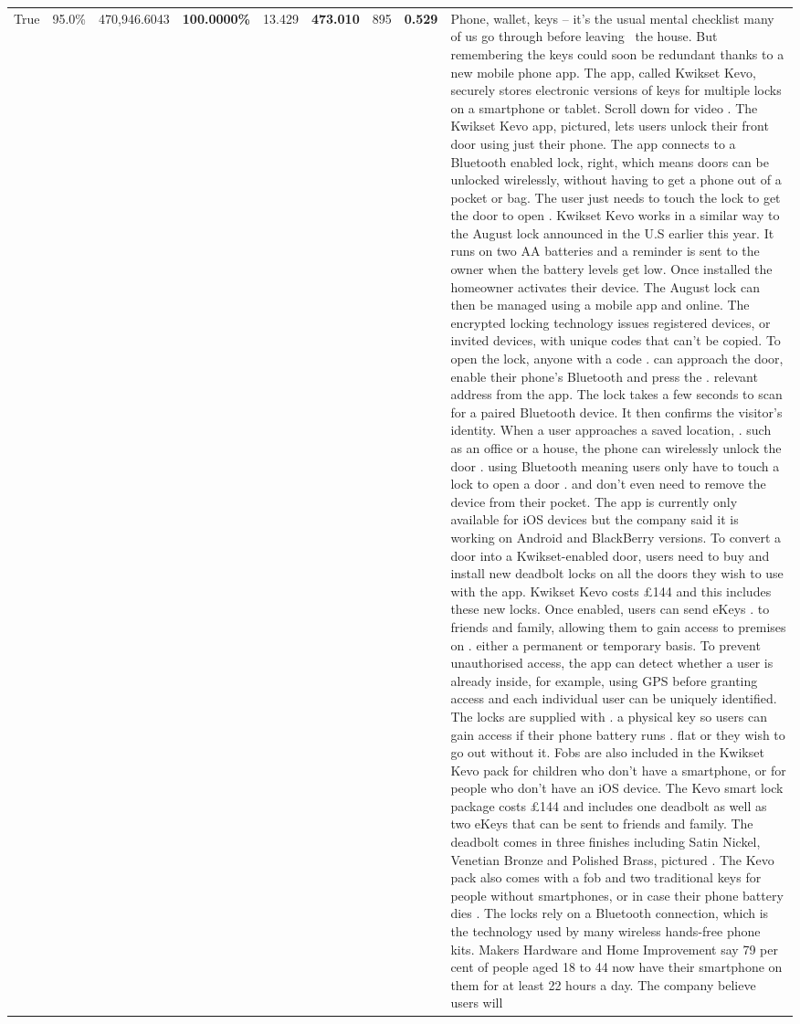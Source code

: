 \begin{table}[H]
\begin{tabular}{lllrlllll}
True & 95.0\% & 470,946.6043 & \bfseries \color{red} 100.0000\% & 13.429 & \bfseries \color{red} 473.010 & 895 & \bfseries \color{red} 0.529 & Phone, wallet, keys – it’s the usual mental checklist many of us go through before leaving  the house. But remembering the keys could soon be redundant thanks to a new mobile phone app. The app, called Kwikset Kevo, securely stores electronic versions of keys for multiple locks on a smartphone or tablet. Scroll down for video . The Kwikset Kevo app, pictured, lets users unlock their front door using just their phone. The app connects to a Bluetooth enabled lock, right, which means doors can be unlocked wirelessly, without having to get a phone out of a pocket or bag. The user just needs to touch the lock to get the door to open . Kwikset Kevo works in a similar way to the August lock announced in the U.S earlier this year. It runs on two AA batteries and a reminder is sent to the owner when the battery levels get low. Once installed the homeowner activates their device. The August lock can then be managed using a mobile app and online. The encrypted locking technology issues registered devices, or invited devices, with unique codes that can't be copied. To open the lock, anyone with a code . can approach the door, enable their phone's Bluetooth and press the . relevant address from the app. The lock takes a few seconds to scan for a paired Bluetooth device. It then confirms the visitor's identity. When a user approaches a saved location, . such as an office or a house, the phone can wirelessly unlock the door . using Bluetooth meaning users only have to touch a lock to open a door . and don't even need to remove the device from their pocket. The app is currently only available for iOS devices but the company said it is working on Android and BlackBerry versions. To convert a door into a Kwikset-enabled door, users need to buy and install new deadbolt locks on all the doors they wish to use with the app. Kwikset Kevo costs £144 and this includes these new locks. Once enabled, users can send eKeys . to friends and family, allowing them to gain access to premises on . either a permanent or temporary basis. To prevent unauthorised access, the app can detect whether a user is already inside, for example, using GPS before granting access and each individual user can be uniquely identified. The locks are supplied with . a physical key so users can gain access if their phone battery runs . flat or they wish to go out without it. Fobs are also included in the Kwikset Kevo pack for children who don't have a smartphone, or for people who don't have an iOS device. The Kevo smart lock package costs £144 and includes one deadbolt as well as two eKeys that can be sent to friends and family. The deadbolt comes in three finishes including Satin Nickel, Venetian Bronze and Polished Brass, pictured . The Kevo pack also comes with a fob and two traditional keys for people without smartphones, or in case their phone battery dies . The locks rely on a Bluetooth connection, which is the technology used by many wireless hands-free phone kits. Makers Hardware and Home Improvement say 79 per cent of people aged 18 to 44 now have their smartphone on them for at least 22 hours a day. The company believe users will 
\end{tabular}
\end{table}
